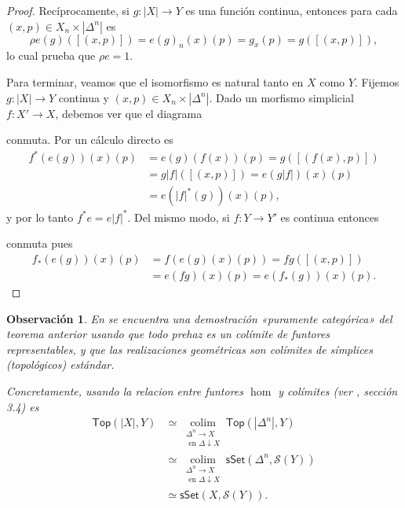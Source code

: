 \documentclass[11pt]{report}
\theoremstyle{colored}
\newtheorem{remark}{Observación}[section]
\newcommand{\cat}[1]{\mathsf{#1}}
\renewcommand{\ss}[1]{\Delta^{#1}}
\newcommand{\catcolim}[2]{\underset{#1}{\operatorname{colim}}#2}
\begin{document}
\begin{proof}
Recíprocamente, si $g : |X| \to Y$ es una función continua, entonces para cada $(x,p) \in X_n \times |\ss{n}|$ es
\[
\rho e(g)([(x,p)]) = e(g)_n(x)(p) = g_x(p) = g([(x,p)]),
\]
lo cual prueba que $\rho e  = 1$.

Para terminar, veamos que el isomorfismo es natural tanto en $X$ como $Y$. Fijemos $g : |X| \to Y$ continua y $(x,p) \in X_n \times |\ss{n}|$. Dado un morfismo simplicial $f : X' \to X$, debemos ver que el diagrama
\begin{center}
\end{center}
conmuta. Por un cálculo directo es
\begin{align*}
f^*(e(g))(x)(p) &= e(g)(f(x))(p) = g([(f(x),p)])\\
& = g|f|([(x,p)]) = e(g|f|)(x)(p)\\
& = e(|f|^*(g))(x)(p),
\end{align*}
y por lo tanto $f^*e = e|f|^*$. Del mismo modo, si $f : Y \to Y'$ es continua entonces
\begin{center}
\end{center}
conmuta pues
\begin{align*}
f_*(e(g))(x)(p) &= f(e(g)(x)(p)) = fg([(x,p)])\\
&= e(fg)(x)(p) = e(f_*(g))(x)(p).
\end{align*}
\end{proof}

\begin{remark} En \cite{GJ} se encuentra una demostración «puramente categórica» del teorema anterior usando que todo prehaz es un colímite de funtores representables, y que las realizaciones geométricas son colímites de símplices (topológicos) estándar.

Concretamente, usando la relacion entre funtores $\hom$ y colímites (ver \cite{context}, sección 3.4) es
\begin{align*}
\cat{Top}(|X|,Y) &\simeq \catcolim{\substack{\ss{n} \to X \\ \text{ en $\Delta \downarrow X$}}}{\cat{Top}(|\ss{n}|,Y)}\\ &\simeq \catcolim{\substack{\ss{n} \to X \\ \text{ en $\Delta \downarrow X$}}}{\cat{sSet}(\ss{n},\mathcal{S}(Y))}\\&\simeq  \cat{sSet}(X,\mathcal{S}(Y)).
\end{align*}
\end{remark}
\end{document}
